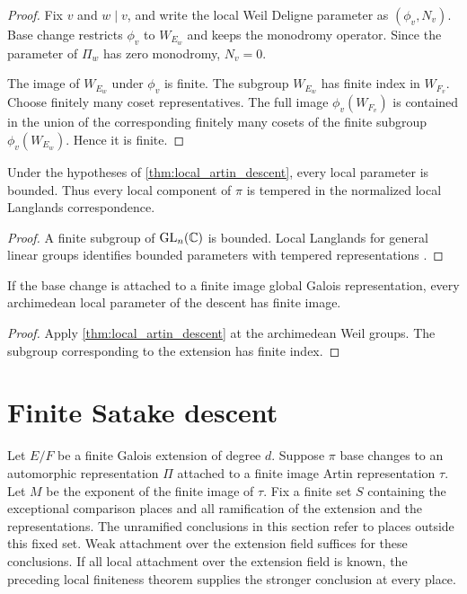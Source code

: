 \begin{proof}
Fix \(v\) and \(w\mid v\), and write the local Weil Deligne parameter as \((\phi_v,N_v)\). Base change restricts \(\phi_v\) to \(W_{E_w}\) and keeps the monodromy operator. Since the parameter of \(\Pi_w\) has zero monodromy, \(N_v=0\).

The image of \(W_{E_w}\) under \(\phi_v\) is finite. The subgroup \(W_{E_w}\) has finite index in \(W_{F_v}\). Choose finitely many coset representatives. The full image \(\phi_v(W_{F_v})\) is contained in the union of the corresponding finitely many cosets of the finite subgroup \(\phi_v(W_{E_w})\). Hence it is finite.
\end{proof}

\begin{corollary}\label{cor:tempered_local_descent}
Under the hypotheses of \cref{thm:local_artin_descent}, every local parameter is bounded. Thus every local component of \(\pi\) is tempered in the normalized local Langlands correspondence.
\end{corollary}

\begin{proof}
A finite subgroup of \(\operatorname{GL}_n(\mathbb C)\) is bounded. Local Langlands for general linear groups identifies bounded parameters with tempered representations \cite{Henniart2000}.
\end{proof}

\begin{corollary}\label{cor:artin_infinity}
If the base change is attached to a finite image global Galois representation, every archimedean local parameter of the descent has finite image.
\end{corollary}

\begin{proof}
Apply \cref{thm:local_artin_descent} at the archimedean Weil groups. The subgroup corresponding to the extension has finite index.
\end{proof}

\section{Finite Satake descent}\label{sec:finite_satake}

Let \(E/F\) be a finite Galois extension of degree \(d\). Suppose \(\pi\) base changes to an automorphic representation \(\Pi\) attached to a finite image Artin representation \(\tau\). Let \(M\) be the exponent of the finite image of \(\tau\). Fix a finite set \(S\) containing the exceptional comparison places and all ramification of the extension and the representations. The unramified conclusions in this section refer to places outside this fixed set. Weak attachment over the extension field suffices for these conclusions. If all local attachment over the extension field is known, the preceding local finiteness theorem supplies the stronger conclusion at every place.

